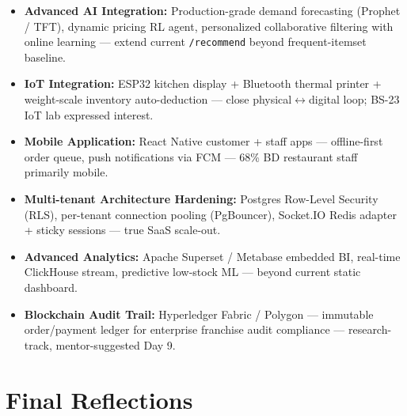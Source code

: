 \begin{itemize}
\item \textbf{Advanced AI Integration:} Production-grade demand forecasting (Prophet / TFT), dynamic pricing RL agent, personalized collaborative filtering with online learning --- extend current \texttt{/recommend} beyond frequent-itemset baseline.
\item \textbf{IoT Integration:} ESP32 kitchen display + Bluetooth thermal printer + weight-scale inventory auto-deduction --- close physical$\leftrightarrow$digital loop; BS-23 IoT lab expressed interest.
\item \textbf{Mobile Application:} React Native customer + staff apps --- offline-first order queue, push notifications via FCM --- 68\% BD restaurant staff primarily mobile.
\item \textbf{Multi-tenant Architecture Hardening:} Postgres Row-Level Security (RLS), per-tenant connection pooling (PgBouncer), Socket.IO Redis adapter + sticky sessions --- true SaaS scale-out.
\item \textbf{Advanced Analytics:} Apache Superset / Metabase embedded BI, real-time ClickHouse stream, predictive low-stock ML --- beyond current static dashboard.
\item \textbf{Blockchain Audit Trail:} Hyperledger Fabric / Polygon --- immutable order/payment ledger for enterprise franchise audit compliance --- research-track, mentor-suggested Day 9.
\end{itemize}

\section{Final Reflections}

